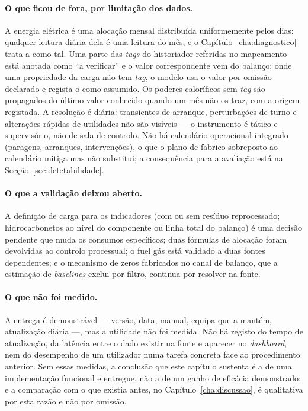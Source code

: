 \paragraph{O que ficou de fora, por limitação dos dados.} A energia
elétrica é uma alocação mensal distribuída uniformemente pelos dias:
qualquer leitura diária dela é uma leitura do mês, e o
Capítulo~\ref{cha:diagnostico} trata-a como tal. Uma parte das
\emph{tags} do historiador referidas no mapeamento está anotada como ``a
verificar'' e o valor correspondente vem do balanço; onde uma
propriedade da carga não tem \emph{tag}, o modelo usa o valor por omissão
declarado e regista-o como assumido. Os poderes caloríficos sem
\emph{tag} são propagados do último valor conhecido quando um mês não os
traz, com a origem registada. A resolução é diária: transientes de
arranque, perturbações de turno e alterações rápidas de utilidades não
são visíveis --- o instrumento é tático e supervisório, não de sala de
controlo. Não há calendário operacional integrado (paragens, arranques,
intervenções), o que o plano de fabrico sobreposto ao calendário mitiga
mas não substitui; a consequência para a avaliação está na
Secção~\ref{sec:detetabilidade}.

\paragraph{O que a validação deixou aberto.} A definição de carga para os
indicadores (com ou sem resíduo reprocessado; hidrocarbonetos ao nível do
componente ou linha total do balanço) é uma decisão pendente que muda os
consumos específicos; duas fórmulas de alocação foram devolvidas ao
controlo processual; o fuel gás está validado a duas fontes dependentes; e
o mecanismo de zeros fabricados no canal de balanço, que a estimação de
\emph{baselines} exclui por filtro, continua por resolver na fonte.

\paragraph{O que não foi medido.} A entrega é demonstrável --- versão,
data, manual, equipa que a mantém, atualização diária ---, mas a utilidade
não foi medida. Não há registo do tempo de atualização, da latência entre o
dado existir na fonte e aparecer no \emph{dashboard}, nem do desempenho de
um utilizador numa tarefa concreta face ao procedimento anterior. Sem essas
medidas, a conclusão que este capítulo sustenta é a de uma implementação
funcional e entregue, não a de um ganho de eficácia demonstrado; e a
comparação com o que existia antes, no Capítulo~\ref{cha:discussao}, é
qualitativa por esta razão e não por omissão.

